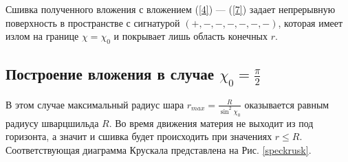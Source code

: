\documentclass[12pt]{article}
\begin{document}
Сшивка полученного вложения с вложением (\ref{4}) --- (\ref{7}) задает непрерывную поверхность в пространстве с сигнатурой $(+, -, -, -, -, -, -)$, которая имеет излом на границе  $\chi = \chi_0$ и покрывает лишь область конечных $r$.

\subsection{ Построение вложения в случае $\chi_0 = \frac{\pi}{2}$}

В этом случае максимальный радиус шара $r_{max} = \frac{R}{\sin^2{\chi_0}}$ оказывается равным радиусу шварцшильда $R$. Во время движения материя не выходит из под горизонта, а значит и сшивка будет происходить при значениях $r \leqslant R$. Соответствующая диаграмма Крускала представлена на Рис. \ref{speckrusk}.
\end{document}
